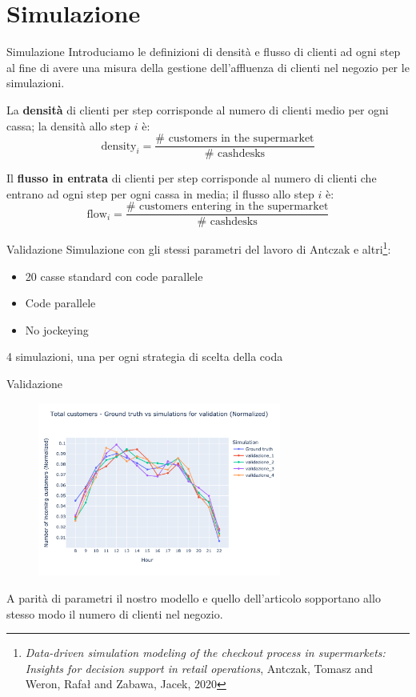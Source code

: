 \section{Simulazione}
\begin{frame}{Simulazione}
	Introduciamo le definizioni di densità e flusso di clienti ad ogni step al fine di avere una misura della gestione dell'affluenza di clienti nel negozio per le simulazioni.
	
	La \textbf{densità} di clienti per step corrisponde al numero di clienti medio per ogni cassa; la densità allo step $i$ è:
	\[\text{density}_i = \frac{\# \text{ customers in the supermarket}}{\# \text{ cashdesks}}\]
	
	Il \textbf{flusso in entrata} di clienti per step corrisponde al numero di clienti che entrano ad ogni step per ogni cassa in media; il flusso allo step $i$ è:
	\[\text{flow}_i = \frac{\# \text{ customers entering in the supermarket}}{\# \text{ cashdesks}}\]
\end{frame}

\begin{frame}{Validazione}
	Simulazione con gli stessi parametri del lavoro di Antczak e altri\footnote{\textit{Data-driven simulation modeling of the checkout process in supermarkets: Insights for decision support in retail operations}, Antczak, Tomasz and Weron, Rafał and Zabawa, Jacek, 2020}: 
	\begin{itemize}
		\item 20 casse standard con code parallele
		\item Code parallele
		\item No jockeying
	\end{itemize}	
	4 simulazioni, una per ogni strategia di scelta della coda
\end{frame}

\begin{frame}{Validazione}
	\begin{figure}[H]
		\centering
		\includegraphics[width=8cm]{"../report/images/results/total_customers_validation.png"}
	\end{figure}
	A parità di parametri il nostro modello e quello dell'articolo sopportano allo stesso modo il numero di clienti nel negozio.
\end{frame}

